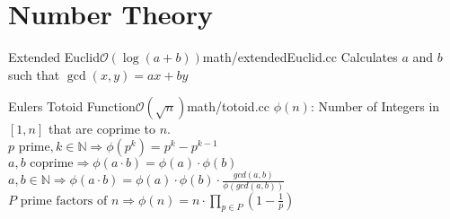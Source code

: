 \section{Number Theory}
\begin{code}{Extended Euclid}{$\mathcal{O}(\log(a + b))$}{math/extendedEuclid.cc} 
  Calculates $a$ and $b$ such that $\gcd(x, y) = ax + by$
\end{code}


\begin{code}{Eulers Totoid Function}{$\mathcal{O}(\sqrt{n})$}{math/totoid.cc}
$\phi(n)$: Number of Integers in $[1, n]$ that are coprime to $n$.\\
$p \text{ prime}, k \in \mathbb{N} \Rightarrow \phi(p^k) = p^k - p^{k-1}$ \\
$a, b \text{ coprime} \Rightarrow \phi(a \cdot b) = \phi(a) \cdot \phi(b)$ \\
$a, b \in \mathbb{N} \Rightarrow \phi(a \cdot b) = \phi(a) \cdot \phi(b) \cdot \frac{gcd(a, b)}{\phi(gcd(a,b))}$ \\
$P \text{ prime factors of } n \Rightarrow \phi(n) = n \cdot \prod_{p \in P} (1 - \frac{1}{p})$
\end{code}


